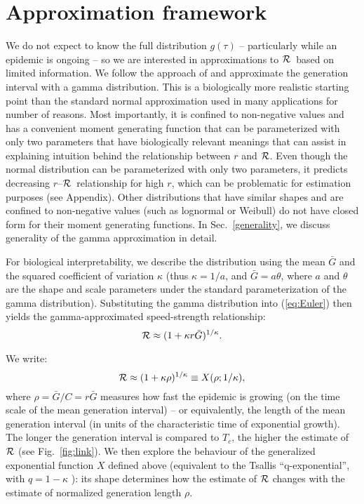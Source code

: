 \documentclass[12pt]{article}
\newcommand{\rR}{\mbox{$r$--$\cal R$}}
\newcommand{\RR}{\ensuremath{{\cal R}}}
\newcommand{\Tc}{\ensuremath{C}}
\newcommand{\eref}[1]{(\ref{eq:#1})}
\newcommand{\fref}[1]{Fig.~\ref{fig:#1}}
\newcommand{\sref}[1]{Sec.~\ref{#1}}
\begin{document}
\section{Approximation framework}
\label{approxframe}

We do not expect to know the full distribution $g(\tau)$ -- particularly while an epidemic is ongoing -- so we are interested in approximations to \RR\ based on limited information.
We follow the approach of \cite{NishCast09} and approximate the generation interval with a gamma distribution.
This is a biologically more realistic starting point than the standard normal approximation used in many applications for number of reasons.
Most importantly, it is confined to non-negative values and has a convenient moment generating function that can be parameterized with only two parameters that have biologically relevant meanings that can assist in explaining intuition behind the relationship between $r$ and \RR.
Even though the normal distribution can be parameterized with only two parameters, it predicts decreasing \rR\ relationship for high $r$, which can be problematic for estimation purposes (see Appendix).
Other distributions that have similar shapes and are confined to non-negative values (such as lognormal or Weibull) do not have closed form for their moment generating functions.
In \sref{generality}, we discuss generality of the gamma approximation in detail.

For biological interpretability, we describe the distribution using the mean $\bar G$ and the squared coefficient of variation $\kappa$ (thus $\kappa = 1/a$, and $\bar G = a\theta$, where $a$ and $\theta$ are the shape and scale parameters under the standard parameterization of the gamma distribution).
Substituting the gamma distribution into \eref{Euler} then yields the gamma-approximated speed-strength relationship:
\begin{equation}
	\RR \approx (1 + \kappa r \bar G)^{1/\kappa}.
	\label{eq:gamApp}
\end{equation}

We write:
\begin{equation}
	\RR \approx (1 + \kappa \rho)^{1/\kappa} \equiv X(\rho; 1/\kappa),
	\label{eq:genExp}
\end{equation}
where $\rho = \bar G/\Tc = r\bar G$ measures how fast the epidemic is growing (on the time scale of the mean generation interval) -- or equivalently, the length of the mean generation interval (in units of the characteristic time of exponential growth).
The longer the generation interval is compared to $T_c$, the higher the estimate of $\RR$ (see \fref{link}).
We then explore the behaviour of the generalized exponential function $X$ defined above (equivalent to the Tsallis ``q-exponential'', with $q=1-\kappa$ \cite{tsallis1994numbers}): its shape determines how the estimate of $\RR$ changes with the estimate of normalized generation length $\rho$.
\end{document}
